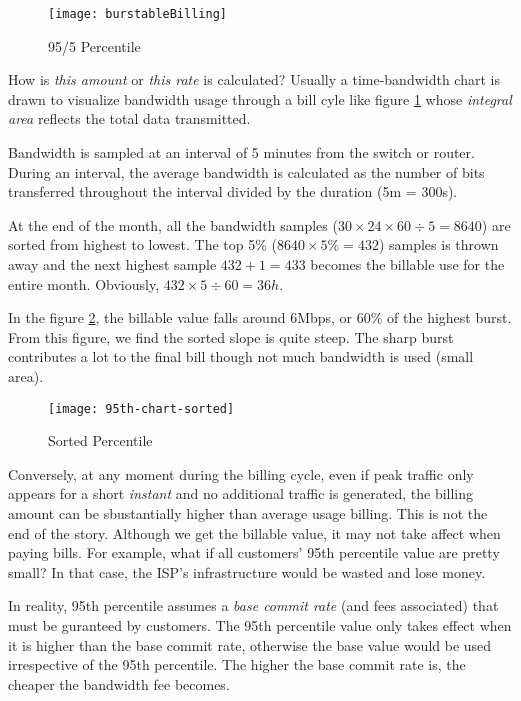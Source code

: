 \begin{figure}[!htb]
  \centering
  \texttt{[image: burstableBilling]}
  \caption{95/5 Percentile}
  \label{fig:95-percentile}
\end{figure}

How is \textit{this amount} or \textit{this rate} is calculated?
Usually a time-bandwidth chart is drawn to visualize bandwidth
usage through a bill cyle like figure \ref{fig:95-percentile}
whose \textit{integral area} reflects the total data transmitted.

Bandwidth is sampled at an interval of 5 minutes from the switch
or router. During an interval, the average bandwidth is calculated
as the number of bits transferred throughout the interval divided
by the duration (5m = 300s).

At the end of the month, all the bandwidth samples
($30 \times 24 \times 60 \div 5 = 8640$) are sorted from highest
to lowest. The top 5\% ($8640 \times 5\% = 432$) samples is thrown
away and the next highest sample $432 + 1 = 433$ becomes the
billable use for the entire month. Obviously,
$432 \times 5 \div 60 = 36h$.

In the figure \ref{fig:sorted-95th-percentile}, the
billable value falls around 6Mbps, or 60\% of the highest
burst. From this figure, we find the sorted slope is quite
steep. The sharp burst contributes a lot to the final bill though
not much bandwidth is used (small area).

\begin{figure}[!htb]
  \centering
  \texttt{[image: 95th-chart-sorted]}
  \caption{Sorted Percentile}
  \label{fig:sorted-95th-percentile}
\end{figure}

Conversely, at any moment during the billing cycle, even if peak
traffic only appears for a short \textit{instant} and no
additional traffic is generated, the billing amount can be
sbustantially higher than average usage billing. This is not the
end of the story. Although we get the billable value, it may not
take affect when paying bills. For example, what if all customers'
95th percentile value are pretty small? In that case, the ISP's
infrastructure would be wasted and lose money.

In reality, 95th percentile assumes a \textit{base commit rate}
(and fees associated) that must be guranteed by customers. The
95th percentile value only takes effect when it is higher than the
base commit rate, otherwise the base value would be used
irrespective of the 95th percentile. The higher the base commit
rate is, the cheaper the bandwidth fee becomes.

